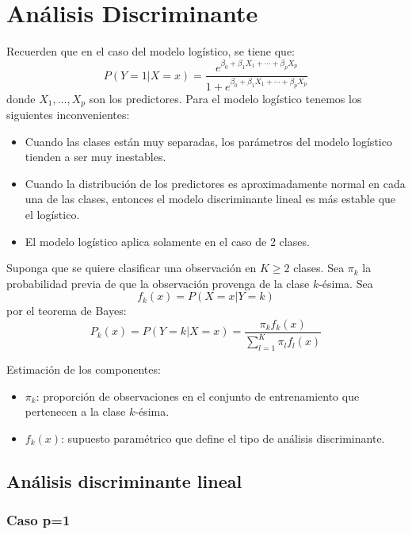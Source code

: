 \documentclass[
  12pt,
]{book}
\providecommand{\tightlist}{%
  \setlength{\itemsep}{0pt}\setlength{\parskip}{0pt}}
\theoremstyle{definition}
\theoremstyle{definition}
\theoremstyle{definition}
\theoremstyle{definition}
\theoremstyle{remark}
\begin{document}
\hypertarget{anuxe1lisis-discriminante}{%
\section{Análisis Discriminante}\label{anuxe1lisis-discriminante}}

Recuerden que en el caso del modelo logístico, se tiene que:
\[P(Y=1|X=x)=\frac{e^{\beta_0+\beta_1X_1+\cdots+\beta_pX_p}}{1+e^{\beta_0+\beta_1X_1+\cdots+\beta_pX_p}}\]
donde \(X_1,\ldots,X_p\) son los predictores. Para el modelo logístico tenemos los siguientes inconvenientes:

\begin{itemize}
\item
  Cuando las clases están muy separadas, los parámetros del modelo logístico tienden a ser muy inestables.
\item
  Cuando la distribución de los predictores es aproximadamente normal en cada una de las clases, entonces el modelo discriminante lineal es más estable que el logístico.
\item
  El modelo logístico aplica solamente en el caso de 2 clases.
\end{itemize}

Suponga que se quiere clasificar una observación en \(K\geq 2\) clases. Sea \(\pi_k\) la probabilidad previa de que la observación provenga de la clase \(k\)-ésima. Sea
\[f_k(x)=P(X=x|Y=k)\]
por el teorema de Bayes:
\[P_k(x)=P(Y=k|X=x)=\frac{\pi_kf_k(x)}{\sum_{l=1}^K \pi_lf_l(x)}\]

Estimación de los componentes:

\begin{itemize}
\tightlist
\item
  \(\pi_k\): proporción de observaciones en el conjunto de entrenamiento que pertenecen a la clase \(k\)-ésima.
\item
  \(f_k(x)\): supuesto paramétrico que define el tipo de análisis discriminante.
\end{itemize}

\hypertarget{anuxe1lisis-discriminante-lineal}{%
\subsection{Análisis discriminante lineal}\label{anuxe1lisis-discriminante-lineal}}

\hypertarget{caso-p1}{%
\subsubsection{Caso p=1}\label{caso-p1}}
\end{document}
